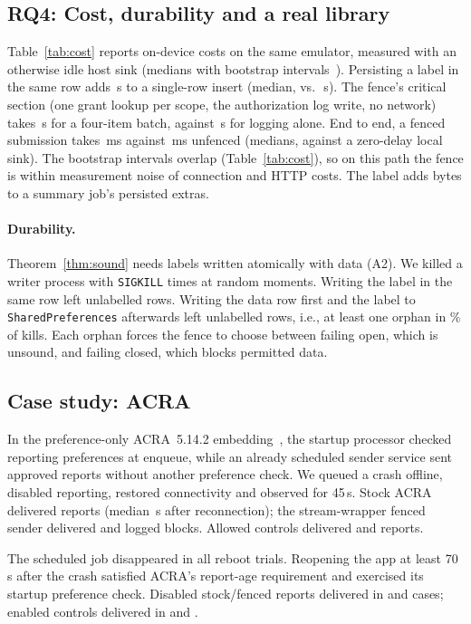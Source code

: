 \subsection{RQ4: Cost, durability and a real library}
\label{sec:eval-cost}



Table~\ref{tab:cost} reports on-device costs on the same emulator, measured with an otherwise idle host sink (medians with bootstrap intervals~\cite{efron1979bootstrap}). Persisting a
label in the same row adds \insDeltaUs{}\,\textmu{}s to a single-row insert (median, \insNoUs{} vs.\ \insLabUs{}\,\textmu{}s).
The fence's critical section (one grant lookup per scope, the authorization log write, no network) takes \fenceRdUs{}\,\textmu{}s
for a four-item batch, against \fenceNoneUs{}\,\textmu{}s for logging alone. End to end, a fenced submission takes
\eeRdMs{}\,ms against \eeNoneMs{}\,ms unfenced (medians, against a zero-delay local sink). The bootstrap intervals overlap
(Table~\ref{tab:cost}), so on this path the fence is within measurement noise of connection and HTTP costs. The label adds \extrasDelta{} bytes to a summary job's persisted
extras.

\paragraph{Durability.} Theorem~\ref{thm:sound} needs labels written atomically with data (A2). We killed a writer process
with \texttt{SIGKILL} \crashKills{} times at random moments. Writing the label in the same row left \crashOrphA{} unlabelled
rows. Writing the data row first and the label to \texttt{SharedPreferences} afterwards left \crashOrphB{} unlabelled rows,
i.e., at least one orphan in \crashOrphBPct{}\% of kills. Each orphan forces the fence to choose between failing open,
which is unsound, and failing closed, which blocks permitted data.

\subsection{Case study: ACRA}
\label{sec:eval-acra-historical}

In the preference-only ACRA~5.14.2 embedding~\cite{acra}, the startup processor
checked reporting preferences at enqueue, while an already scheduled sender service
sent approved reports without another preference check. We queued a crash offline, disabled
reporting, restored connectivity and observed for 45\,s. Stock ACRA delivered
\acraStockLeak{} reports (median \acraLatencyMed{}\,s after reconnection); the stream-wrapper fenced
sender delivered \acraFenceLeak{} and logged \acraFenceBlockLogged{} blocks. Allowed controls
delivered \acraStockCtl{} and \acraFenceCtl{} reports.

The scheduled job disappeared in all \acraJobGoneReb{} reboot trials. Reopening the app
at least 70\,s after the crash satisfied ACRA's report-age requirement and exercised its
startup preference check. Disabled stock/fenced reports delivered in \acraStockReb{} and
\acraFenceReb{} cases; enabled controls delivered in \acraStockRebCtl{} and
\acraFenceRebCtl{}.
